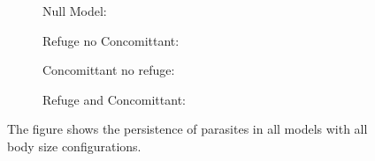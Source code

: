 \documentclass[11pt]{amsart}
\begin{document}
\begin{figure}[h]
\begin{subfigure}[t]{.45\textwidth}
\caption{Null Model:\label{fig:persistenceParaa}}
\end{subfigure}
\begin{subfigure}[t]{.45\textwidth}
\caption{Refuge no Concomittant:\label{fig:persistenceParab}}
\end{subfigure}

\begin{subfigure}[ct]{.45\textwidth}
\caption{Concomittant no refuge:\label{fig:persistenceParac}}
\end{subfigure}
\begin{subfigure}[ct]{.45\textwidth}
\caption{Refuge and Concomittant:\label{fig:persistenceParad}}
\end{subfigure}
\caption{The figure shows the persistence of parasites in all models with all body size configurations.}
\label{fig:persistencePara}
\end{figure}
\end{document}
